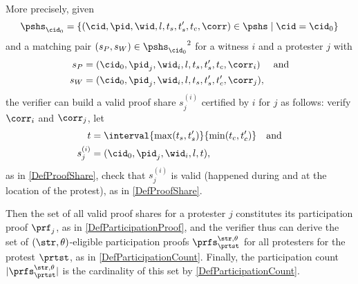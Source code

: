 More precisely, given \[
  \pshs_{\cid_0} = \{ (\cid, \pid, \wid, l, t_s, t_s', t_c, \corr) \in \pshs 
  \mid \cid = \cid_0 \}
\] and a matching pair \((s_P, s_W) \in {\pshs_{\cid_0}}^2\) for a witness 
\(i\) and a protester \(j\) with
\begin{align*}
  s_P &= (\cid_0, \pid_j, \wid_i, l, t_s, t_s', t_c, \corr_i) &\text{and} \\
  s_W &= (\cid_0, \pid_j, \wid_i, l, t_s, t_s', t_c', \corr_j),
\end{align*}
the verifier can build a valid proof share \(s_j^{(i)}\) certified by \(i\) for 
\(j\) as follows:
verify \(\corr_i\) and \(\corr_j\),
let
\begin{align*}
  t &= \interval{\max(t_s, t_s')}{\min(t_c, t_c')} &\text{and} \\
  s_j^{(i)} &= (\cid_0, \pid_j, \wid_i, l, t),
\end{align*}
as in \cref{DefProofShare},
check that \(s_j^{(i)}\) is valid (\ie happened during and at the location of 
the protest), as in \cref{DefProofShare}.

Then the set of all valid proof shares for a protester \(j\) constitutes its 
participation proof \(\prf_{j}\), as in \cref{DefParticipationProof},
and the verifier thus can derive the set of \((\str,\theta)\)-eligible participation proofs \(\prfs_{\prtst}^{\str,\theta}\) for all protesters for the protest \(\prtst\), as in \cref{DefParticipationCount}.
Finally, the  participation count \(|\prfs_{\prtst}^{\str,\theta}|\) is the cardinality of this set by  \cref{DefParticipationCount}.






